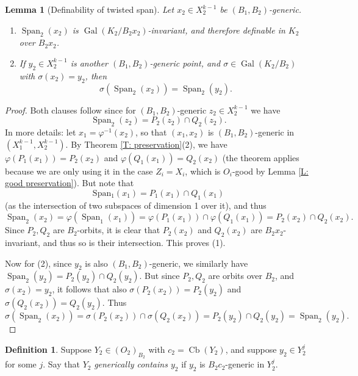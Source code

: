 \documentclass{amsart}
\newtheorem{lemma}[theorem]{Lemma}
\theoremstyle{definition}
\newtheorem{definition}[theorem]{Definition}
\begin{document}
    \begin{lemma}[Definability of twisted span]\label{L: definability of span} Let $x_2\in X_2^{k-1}$ be $(B_1,B_2)$-generic.
    
    \begin{enumerate}
        \item $\operatorname{Span}_2(x_2)$ is $\operatorname{Gal}(K_2/B_2x_2)$-invariant, and therefore definable in $K_2$ over $B_2x_2$.
        \item If $y_2\in X_2^{k-1}$ is another $(B_1,B_2)$-generic point, and $\sigma\in\operatorname{Gal}(K_2/B_2)$ with $\sigma(x_2)=y_2$, then $$\sigma(\operatorname{Span}_2(x_2))=\operatorname{Span}_2(y_2).$$ \end{enumerate}
        \end{lemma}
    \begin{proof}
        Both clauses follow since for $(B_1,B_2)$-generic $z_2\in X_2^{k-1}$ we have $$\operatorname{Span}_2(z_2)=P_2(z_2)\cap Q_2(z_2).$$ In more details: let $x_1=\varphi^{-1}(x_2)$, so that $(x_1,x_2)$ is $(B_1,B_2)$-generic in $(X_1^{k-1},X_2^{k-1})$. By Theorem \ref{T: preservation}(2), we have $\varphi(P_1(x_1))=P_2(x_2)$ and $\varphi(Q_1(x_1))=Q_2(x_2)$ (the theorem applies because we are only using it in the case $Z_i=X_i$, which is $O_i$-good by Lemma \ref{L: good preservation}). But note that $$\operatorname{Span_1}(x_1)=P_1(x_1)\cap Q_1(x_1)$$ (as the intersection of two subspaces of dimension 1 over it), and thus $$\operatorname{Span}_2(x_2)=\varphi(\operatorname{Span}_1(x_1))=\varphi(P_1(x_1))\cap\varphi(Q_1(x_1))=P_2(x_2)\cap Q_2(x_2).$$ Since $P_2,Q_2$ are $B_2$-orbits, it is clear that $P_2(x_2)$ and $Q_2(x_2)$ are $B_2x_2$-invariant, and thus so is their intersection. This proves (1).
        
        Now for (2), since $y_2$ is also $(B_1,B_2)$-generic, we similarly have $\operatorname{Span}_2(y_2)=P_2(y_2)\cap Q_2(y_2)$. But since $P_2,Q_2$ are orbits over $B_2$, and $\sigma(x_2)=y_2$, it follows that also $\sigma(P_2(x_2))=P_2(y_2)$ and $\sigma(Q_2(x_2))=Q_2(y_2)$. Thus $$\sigma(\operatorname{Span}_2(x_2))=\sigma(P_2(x_2))\cap \sigma(Q_2(x_2))=P_2(y_2)\cap Q_2(y_2)=\operatorname{Span}_2(y_2).$$ 

    \end{proof}

    \begin{definition}
        Suppose $Y_2\in(O_2)_{B_2}$ with $c_2=\operatorname{Cb}(Y_2)$, and suppose $y_2\in Y_2^{j}$ for some $j$. Say that $Y_2$ \textit{generically contains $y_2$} if $y_2$ is $B_2c_2$-generic in $Y_2^j$.
    \end{definition}
\end{document}
